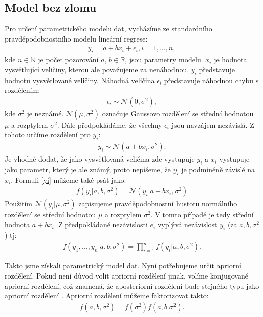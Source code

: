 \documentclass[czech,master,public,dept470,male,cpdeclaration,oneside, python]{diploma}
\begin{document}
\subsection{Model bez zlomu}

Pro určení parametrického modelu dat, vycházíme ze standardního pravděpodobnostního modelu lineární regrese: 
\begin{align}\nonumber
	y_i = a + b x_i + \epsilon_i, i =1,...,n,
\end{align}
kde $n \in \mathbb{N}$ je počet pozorování $a$, $b \in \mathbb{R}$, jsou parametry modelu. $x_i$ je hodnota vysvětlující veličiny, kterou ale považujeme za nenáhodnou. $y_i$ představuje hodnotu vysvětlované veličiny. Náhodná veličina $\epsilon_i$ představuje náhodnou chybu s rozdělením:
\begin{align*}
	\epsilon_i \sim \mathcal{N}(0, \sigma^2),
\end{align*}
kde $\sigma^2$ je neznámé. $\mathcal{N}(\mu, \sigma^2)$ označuje Gaussovo rozdělení se střední hodnotou $\mu$ a rozptylem $\sigma^2$. Dále předpokládáme, že všechny $\epsilon_i$ jsou navzájem nezávislá.
Z tohoto určíme rozdělení pro $y_i$:
\begin{align}\label{yi}
	y_i \sim \mathcal{N}(a + bx_i, \sigma^2).
\end{align}
Je vhodné dodat, že jako vysvětlovaná veličina zde vystupuje $y_i$ a $x_i$ vystupuje jako parametr, který je ale známý, proto nepíšeme, že $y_i$ je podmíněně závislé na $x_i$. Formuli \eqref{yi} můžeme také psát jako:
\begin{align}\nonumber
	f(y_i | a, b, \sigma^2) = \mathcal{N}(y_i | a + bx_i, \sigma^2)
\end{align}
Použitím $\mathcal{N}(y_i | \mu, \sigma^2)$ zapisujeme pravděpodobnostní hustotu normálního rozdělení se střední hodnotou $\mu$ a rozptylem $\sigma^2$. V tomto případě je tedy střední hodnota $a + bx_i$. Z předpokládané nezávislosti $e_i$ vyplývá nezávislost $y_i$ (za $a,b,\sigma^2$) tj:
\begin{align}\nonumber
f(y_1, ..., y_n | a,b,\sigma^2) = \prod_{i=1}^{n} f(y_i|a,b,\sigma^2).
\end{align}
\par
Takto jsme získali parametrický model dat. Nyní potřebujeme určit apriorní rozdělení.
Pokud není důvod volit apriorní rozdělení jinak, volíme konjugované apriorní rozdělení, což znamená, že aposteriorní rozdělení bude stejného typu jako apriorní rozdělení \cite{robert2007bayesian}. Apriorní rozdělení můžeme faktorizovat takto:
\begin{align}\nonumber
	f(a, b, \sigma^2) = f(\sigma^2)f(a,b | \sigma^2).
\end{align}
\end{document}
